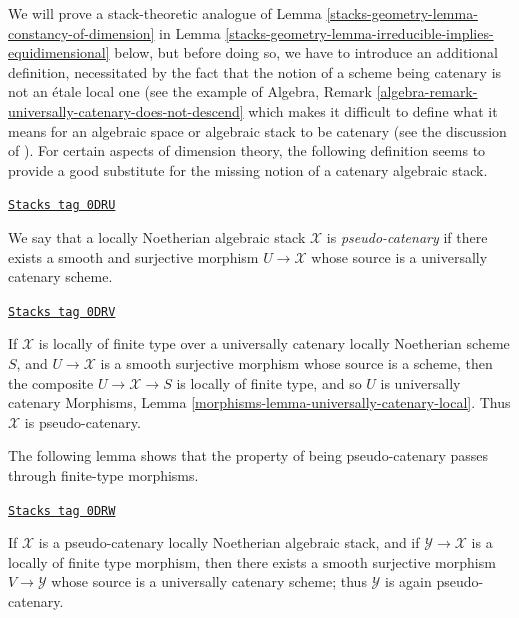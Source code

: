 We will prove a stack-theoretic analogue
of Lemma \ref{stacks-geometry-lemma-constancy-of-dimension}
in Lemma \ref{stacks-geometry-lemma-irreducible-implies-equidimensional} below,
but before doing so, we have to introduce an additional definition,
necessitated by the fact that the notion of a scheme being catenary
is not an \'etale local one
(see the example of
Algebra, Remark \ref{algebra-remark-universally-catenary-does-not-descend}
which makes it difficult to define what it means for an algebraic
space or algebraic stack to be catenary
(see the discussion of \cite[page 3]{Osserman}).
For certain aspects of dimension theory, the following
definition seems to provide a good substitute for the missing
notion of a catenary algebraic stack.

\begin{definition}
\label{stacks-geometry-definition-pseudo-catenary}
\href{https://stacks.math.columbia.edu/tag/0DRU}{\texttt{Stacks tag 0DRU}}

We say that a locally Noetherian algebraic stack $\mathcal{X}$
is {\it pseudo-catenary} if there exists a smooth
and surjective morphism $U \to \mathcal{X}$ whose source is
a universally catenary scheme.
\end{definition}

\begin{example}
\label{stacks-geometry-example-pseudo-catenary}
\href{https://stacks.math.columbia.edu/tag/0DRV}{\texttt{Stacks tag 0DRV}}

If $\mathcal{X}$ is locally of finite type over a universally
catenary locally Noetherian scheme $S$,
and $U\to \mathcal{X}$ is a smooth surjective morphism
whose source is a scheme, then the composite
$U \to \mathcal{X} \to S$ is locally of finite type,
and so $U$ is universally catenary
Morphisms, Lemma
\ref{morphisms-lemma-universally-catenary-local}.
Thus $\mathcal{X}$ is pseudo-catenary.
\end{example}

The following lemma shows that the property of being pseudo-catenary
passes through finite-type morphisms.

\begin{lemma}
\label{stacks-geometry-lemma-catenary-covers}
\href{https://stacks.math.columbia.edu/tag/0DRW}{\texttt{Stacks tag 0DRW}}

If $\mathcal{X}$ is a pseudo-catenary locally Noetherian algebraic
stack, and if $\mathcal{Y} \to \mathcal{X}$ is a locally of finite type
morphism,
then there exists a smooth surjective morphism $V \to \mathcal{Y}$
whose source is a universally catenary scheme; thus
$\mathcal{Y}$ is again pseudo-catenary.
\end{lemma}


